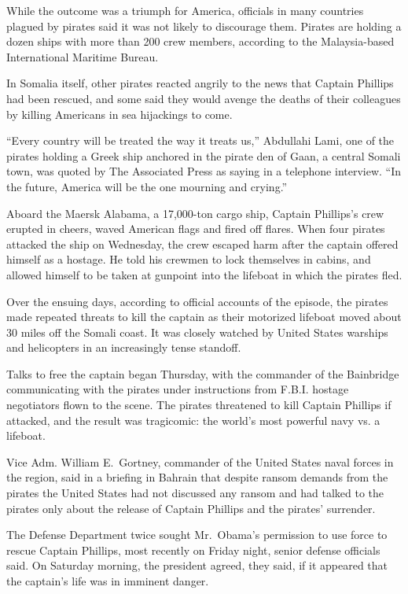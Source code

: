 \documentclass[12pt,a4paper,onecolumn]{article}
\begin{document}
While the outcome was a triumph for America, officials in many countries plagued by pirates said it
was not likely to discourage them. Pirates are holding a dozen ships with more than 200 crew
members, according to the Malaysia-based International Maritime Bureau.

In Somalia itself, other pirates reacted angrily to the news that Captain Phillips had been rescued,
and some said they would avenge the deaths of their colleagues by killing Americans in sea
hijackings to come.

``Every country will be treated the way it treats us,'' Abdullahi Lami, one of the pirates holding a
Greek ship anchored in the pirate den of Gaan, a central Somali town, was quoted by The Associated
Press as saying in a telephone interview. ``In the future, America will be the one mourning and
crying.''

Aboard the Maersk Alabama, a 17,000-ton cargo ship, Captain Phillips's crew erupted in cheers, waved
American flags and fired off flares. When four pirates attacked the ship on Wednesday, the crew
escaped harm after the captain offered himself as a hostage. He told his crewmen to lock themselves
in cabins, and allowed himself to be taken at gunpoint into the lifeboat in which the pirates fled.

Over the ensuing days, according to official accounts of the episode, the pirates made repeated
threats to kill the captain as their motorized lifeboat moved about 30 miles off the Somali coast.
It was closely watched by United States warships and helicopters in an increasingly tense standoff.

Talks to free the captain began Thursday, with the commander of the Bainbridge communicating with
the pirates under instructions from F.B.I. hostage negotiators flown to the scene. The pirates
threatened to kill Captain Phillips if attacked, and the result was tragicomic: the world's most
powerful navy vs. a lifeboat.

Vice Adm. William E.~Gortney, commander of the United States naval forces in the region, said in a
briefing in Bahrain that despite ransom demands from the pirates the United States had not discussed
any ransom and had talked to the pirates only about the release of Captain Phillips and the pirates'
surrender.

The Defense Department twice sought Mr.~Obama's permission to use force to rescue Captain Phillips,
most recently on Friday night, senior defense officials said. On Saturday morning, the president
agreed, they said, if it appeared that the captain's life was in imminent danger.
\end{document}
